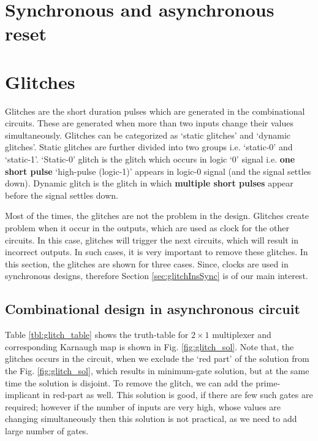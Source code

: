 

\section{Synchronous and asynchronous reset}

\section{Glitches}
Glitches are the short duration pulses which are generated in the combinational circuits. These are generated when more than two inputs change their values simultaneously. Glitches can be categorized as `static glitches' and `dynamic glitches'. Static glitches are further divided into two groups i.e. `static-0' and `static-1'. `Static-0' glitch is the glitch which occurs in logic `0' signal i.e. \textbf{one short pulse} `high-pulse (logic-1)' appears in logic-0 signal (and the signal settles down). Dynamic glitch is the glitch in which \textbf{multiple short pulses} appear before the signal settles down. 

\begin{noNumBox}
 Most of the times, the glitches are not the problem in the design. Glitches create problem when it occur in the outputs, which are used as clock for the other circuits. In this case, glitches will trigger the next circuits, which will result in incorrect outputs. In such cases, it is very important to remove these glitches. In this section, the glitches are shown for three cases. Since, clocks are used in synchronous designs, therefore Section \ref{sec:glitchInsSync} is of our main interest.
 \end{noNumBox} 
  
\subsection{Combinational design in asynchronous circuit}
Table \ref{tbl:glitch_table} shows the truth-table for $2 \times 1$ multiplexer and corresponding Karnaugh map is shown in Fig. \ref{fig:glitch_sol}. Note that, the glitches occurs in the circuit, when we exclude the `red part' of the solution from the Fig. \ref{fig:glitch_sol}, which results in minimum-gate solution, but at the same time the solution is disjoint. To remove the glitch, we can add the prime-implicant in red-part as well. This solution is good, if there are few such gates are required; however if the number of inputs are very high, whose values are changing simultaneously then this solution is not practical, as we need to add large number of gates.

